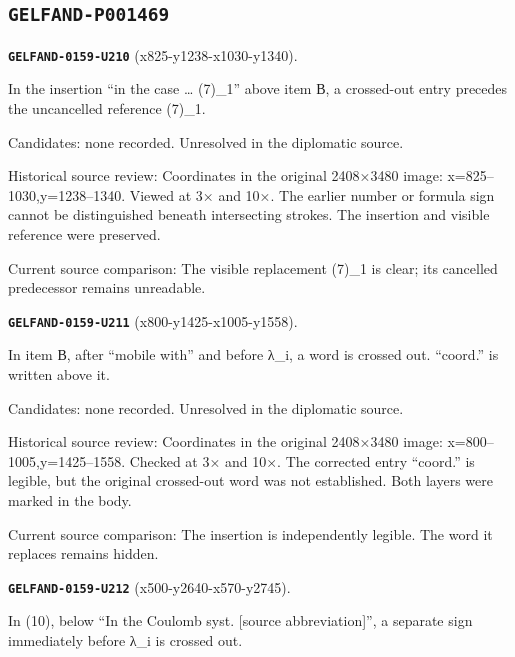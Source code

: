 \subsection*{\texttt{GELFAND-P001469}}
\par\noindent\leavevmode{}\label{GELFAND-0159-U210}\label{GELFAND-P001469:x825-y1238-x1030-y1340}\textbf{\texttt{GELFAND-0159-U210}} (x825-y1238-x1030-y1340).\nopagebreak[4]\par
In the insertion “in the case … (7)\_1” above item В, a crossed-out entry precedes the uncancelled reference (7)\_1.\par
Candidates: none recorded. Unresolved in the diplomatic source.\par
Historical source review: Coordinates in the original 2408×3480 image: x=825–1030,y=1238–1340. Viewed at 3× and 10×. The earlier number or formula sign cannot be distinguished beneath intersecting strokes. The insertion and visible reference were preserved.\par
Current source comparison: The visible replacement (7)\_1 is clear; its cancelled predecessor remains unreadable.\par\medskip
\par\noindent\leavevmode{}\label{GELFAND-0159-U211}\label{GELFAND-P001469:x800-y1425-x1005-y1558}\textbf{\texttt{GELFAND-0159-U211}} (x800-y1425-x1005-y1558).\nopagebreak[4]\par
In item В, after “mobile with” and before λ\_i, a word is crossed out. “coord.” is written above it.\par
Candidates: none recorded. Unresolved in the diplomatic source.\par
Historical source review: Coordinates in the original 2408×3480 image: x=800–1005,y=1425–1558. Checked at 3× and 10×. The corrected entry “coord.” is legible, but the original crossed-out word was not established. Both layers were marked in the body.\par
Current source comparison: The insertion is independently legible. The word it replaces remains hidden.\par\medskip
\par\noindent\leavevmode{}\label{GELFAND-0159-U212}\label{GELFAND-P001469:x500-y2640-x570-y2745}\textbf{\texttt{GELFAND-0159-U212}} (x500-y2640-x570-y2745).\nopagebreak[4]\par
In (10), below “In the Coulomb syst. [source abbreviation]”, a separate sign immediately before λ\_i is crossed out.\par
